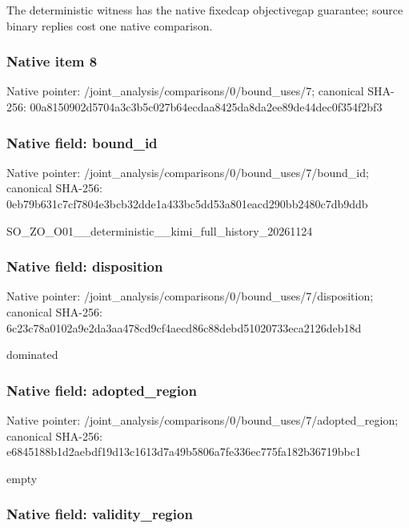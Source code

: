 \documentclass[10pt,a4paper]{article}
\begin{document}
The deterministic witness has the native fixedcap objectivegap guarantee; source binary replies cost one native comparison.


\subsubsection{Native item 8}


Native pointer: /joint\_analysis/comparis\allowbreak{}ons/0/bound\_uses/7; canonical SHA-256: 00a8150902d5704a3c3b5c02\allowbreak{}7b64ecdaa8425da8da2ee89d\allowbreak{}e44dec0f354f2bf3



\subsubsection{Native field: bound\_id}


Native pointer: /joint\_analysis/comparis\allowbreak{}ons/0/bound\_uses/7/bound\allowbreak{}\_id; canonical SHA-256: 0eb79b631c7cf7804e3bcb32\allowbreak{}dde1a433bc5dd53a801eacd2\allowbreak{}90bb2480c7db9ddb


SO\_ZO\_O01\_\_deterministic\allowbreak{}\_\_kimi\_full\_history\_2026\allowbreak{}1124


\subsubsection{Native field: disposition}


Native pointer: /joint\_analysis/comparis\allowbreak{}ons/0/bound\_uses/7/dispo\allowbreak{}sition; canonical SHA-256: 6c23c78a0102a9e2da3aa478\allowbreak{}cd9cf4aecd86c88debd51020\allowbreak{}733eca2126deb18d


dominated


\subsubsection{Native field: adopted\_region}


Native pointer: /joint\_analysis/comparis\allowbreak{}ons/0/bound\_uses/7/adopt\allowbreak{}ed\_region; canonical SHA-256: e6845188b1d2aebdf19d13c1\allowbreak{}613d7a49b5806a7fe336ec77\allowbreak{}5fa182b36719bbc1


empty


\subsubsection{Native field: validity\_region}
\end{document}
